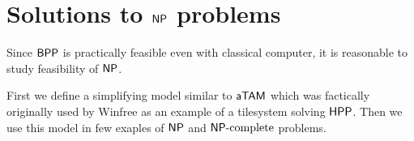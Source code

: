 \chapter{Solutions to $\mathsf{NP}$ problems}   %
\label{chap:problems}

Since $\mathsf{BPP}$ is practically feasible even with classical computer, it is reasonable to study feasibility of $\mathsf{NP}$.

First we define a simplifying model similar to $\mathsf{aTAM}$ which was factically originally used by Winfree \cite{winfree_phd} as an example of a tilesystem solving $\sf HPP$. Then we use this model in few exaples of $\mathsf{NP}$ and $\mathsf{NP}\textnormal{-complete}$ problems.





\newpage


\newpage

